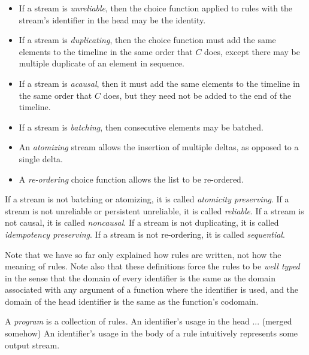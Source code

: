 \begin{itemize}
\item If a stream is {\em unreliable}, then the choice function applied to rules with the stream's identifier in the head may be the identity.
\item If a stream is {\em duplicating}, then the choice function must add the same elements to the timeline in the same order that $C$ does, except there may be multiple duplicate of an element in sequence.
\item If a stream is {\em acausal}, then it must add the same elements to the timeline in the same order that $C$ does, but they need not be added to the end of the timeline.
\item If a stream is {\em batching}, then consecutive elements may be batched.
\item An {\em atomizing} stream allows the insertion of multiple deltas, as opposed to a single delta.
\item A {\em re-ordering} choice function allows the list to be re-ordered.
\end{itemize}

If a stream is not batching or atomizing, it is called {\em atomicity preserving}.  If a stream is not unreliable or persistent unreliable, it is called {\em reliable}.  If a stream is not causal, it is called {\em noncausal}.  If a stream is not duplicating, it is called {\em idempotency preserving}.  If a stream is not re-ordering, it is called {\em sequential}.





Note that we have so far only explained how rules are written, not how the meaning of rules.  Note also that these definitions force the rules to be {\em well typed} in the sense that the domain of every identifier is the same as the domain associated with any argument of a function where the identifier is used, and the domain of the head identifier is the same as the function's codomain.

A {\em program} is a collection of rules.  An identifier's usage in the head ... (merged somehow) An identifier's usage in the body of a rule intuitively represents some output stream.


